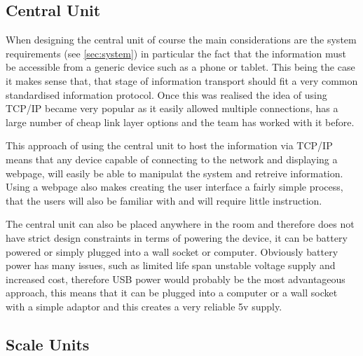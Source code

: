 \subsection{Central Unit}
\label{central design}
When designing the central unit of course the main considerations are the system requirements (see \ref{sec:system}) in particular the fact that the information must be accessible from a generic device such as a phone or tablet. This being the case it makes sense that, that stage of information transport should fit a very common standardised information protocol. Once this was realised the idea of using TCP/IP became very popular as it easily allowed multiple connections, has a large number of cheap link layer options and the team has worked with it before.

This approach of using the central unit to host the information via TCP/IP means that any device capable of connecting to the network and displaying a webpage, will easily be able to manipulat the system and retreive information. Using a webpage also makes creating the user interface a fairly simple process, that the users will also be familiar with and will require little instruction. 

The central unit can also be placed anywhere in the room and therefore does not have strict design constraints  in terms of powering the device, it can be battery powered or simply plugged into a wall socket or computer. Obviously battery power has many issues, such as limited life span unstable voltage supply and increased cost, therefore USB power would probably be the most advantageous approach, this means that it can be plugged into a computer or a wall socket with a simple adaptor and this creates a very reliable 5v supply.

\subsection{Scale Units}


